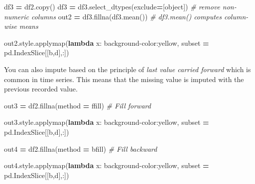 \documentclass[
  letterpaper,
]{scrbook}
\newenvironment{Shaded}{\begin{snugshade}}{\end{snugshade}}
\newcommand{\BuiltInTok}[1]{#1}
\newcommand{\CommentTok}[1]{\textcolor[rgb]{0.56,0.35,0.01}{\textit{#1}}}
\newcommand{\KeywordTok}[1]{\textcolor[rgb]{0.13,0.29,0.53}{\textbf{#1}}}
\newcommand{\NormalTok}[1]{#1}
\newcommand{\OperatorTok}[1]{\textcolor[rgb]{0.81,0.36,0.00}{\textbf{#1}}}
\newcommand{\StringTok}[1]{\textcolor[rgb]{0.31,0.60,0.02}{#1}}
\begin{document}
\begin{Shaded}
\begin{Highlighting}[]
\NormalTok{df3 }\OperatorTok{=}\NormalTok{ df2.copy()}
\NormalTok{df3 }\OperatorTok{=}\NormalTok{ df3.select\_dtypes(exclude}\OperatorTok{=}\NormalTok{[}\BuiltInTok{object}\NormalTok{])   }\CommentTok{\# remove non{-}numeric columns}
\NormalTok{out2 }\OperatorTok{=}\NormalTok{ df3.fillna(df3.mean())  }\CommentTok{\# df3.mean() computes column{-}wise means}

\NormalTok{out2.style.applymap(}\KeywordTok{lambda}\NormalTok{ x: }\StringTok{\textquotesingle{}background{-}color:yellow\textquotesingle{}}\NormalTok{, subset }\OperatorTok{=}\NormalTok{ pd.IndexSlice[[}\StringTok{\textquotesingle{}b\textquotesingle{}}\NormalTok{,}\StringTok{\textquotesingle{}d\textquotesingle{}}\NormalTok{],:])}
\end{Highlighting}
\end{Shaded}

You can also impute based on the principle of \emph{last value carried forward} which is common in time series. This means that the missing value is imputed with the previous recorded value.

\begin{Shaded}
\begin{Highlighting}[]
\NormalTok{out3 }\OperatorTok{=}\NormalTok{ df2.fillna(method }\OperatorTok{=} \StringTok{\textquotesingle{}ffill\textquotesingle{}}\NormalTok{) }\CommentTok{\# Fill forward}

\NormalTok{out3.style.applymap(}\KeywordTok{lambda}\NormalTok{ x: }\StringTok{\textquotesingle{}background{-}color:yellow\textquotesingle{}}\NormalTok{, subset }\OperatorTok{=}\NormalTok{ pd.IndexSlice[[}\StringTok{\textquotesingle{}b\textquotesingle{}}\NormalTok{,}\StringTok{\textquotesingle{}d\textquotesingle{}}\NormalTok{],:])}
\end{Highlighting}
\end{Shaded}

\begin{Shaded}
\begin{Highlighting}[]
\NormalTok{out4 }\OperatorTok{=}\NormalTok{ df2.fillna(method }\OperatorTok{=} \StringTok{\textquotesingle{}bfill\textquotesingle{}}\NormalTok{) }\CommentTok{\# Fill backward}

\NormalTok{out4.style.applymap(}\KeywordTok{lambda}\NormalTok{ x: }\StringTok{\textquotesingle{}background{-}color:yellow\textquotesingle{}}\NormalTok{, subset }\OperatorTok{=}\NormalTok{ pd.IndexSlice[[}\StringTok{\textquotesingle{}b\textquotesingle{}}\NormalTok{,}\StringTok{\textquotesingle{}d\textquotesingle{}}\NormalTok{],:])}
\end{Highlighting}
\end{Shaded}
\end{document}

